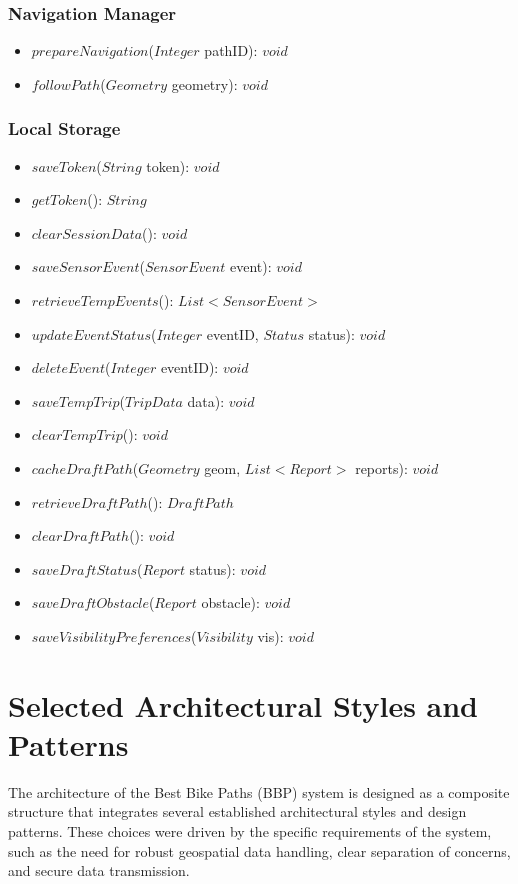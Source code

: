 \subsubsection*{Navigation Manager}
\begin{itemize}
    \item $prepareNavigation$($Integer$ pathID): $void$
    \item $followPath$($Geometry$ geometry): $void$
\end{itemize}

\subsubsection*{Local Storage}
\begin{itemize}
    \item $saveToken$($String$ token): $void$
    \item $getToken$(): $String$
    \item $clearSessionData$(): $void$
    \item $saveSensorEvent$($SensorEvent$ event): $void$
    \item $retrieveTempEvents$(): $List<SensorEvent>$
    \item $updateEventStatus$($Integer$ eventID, $Status$ status): $void$
    \item $deleteEvent$($Integer$ eventID): $void$
    \item $saveTempTrip$($TripData$ data): $void$
    \item $clearTempTrip$(): $void$
    \item $cacheDraftPath$($Geometry$ geom, $List<Report>$ reports): $void$
    \item $retrieveDraftPath$(): $DraftPath$
    \item $clearDraftPath$(): $void$
    \item $saveDraftStatus$($Report$ status): $void$
    \item $saveDraftObstacle$($Report$ obstacle): $void$
    \item $saveVisibilityPreferences$($Visibility$ vis): $void$
\end{itemize}

\section{Selected Architectural Styles and Patterns}
\label{sec:architectural_styles}

The architecture of the Best Bike Paths (BBP) system is designed as a composite structure that integrates several established architectural styles and design patterns. These choices were driven by the specific requirements of the system, such as the need for robust geospatial data handling, clear separation of concerns, and secure data transmission.

